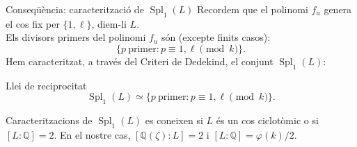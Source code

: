 \documentclass[11pt]{beamer}
\newcommand{\Q}{\ensuremath{\mathbb{Q}}}
\DeclareMathOperator{\Spl}{Spl} %
\begin{document}
	\begin{frame}{Conseqüència: caracterització de $\Spl_1(L)$}
	Recordem que el polinomi $f_u$ genera el cos fix per $\{1,\ell\}$, diem-li $L$.\pause \newline \\
	Els divisors primers del polinomi $f_u$ són (excepte finits casos):
	\begin{equation*}
		\{p \ \text{primer}: p\equiv 1,\ell\pmod{k}\}.
	\end{equation*}\pause
	Hem caracteritzat, a través del Criteri de Dedekind, el conjunt $\Spl_1(L)$:
	\begin{exampleblock}{Llei de reciprocitat}
		\begin{equation*}
			\Spl_1(L)\simeq\{p \ \text{primer}: p\equiv 1, \ell \pmod{k}\}.
		\end{equation*}
	\end{exampleblock}
	\pause
	Caracteritzacions de $\Spl_1(L)$ es coneixen si $L$ és un cos ciclotòmic o si $[L:\Q]=2$. En el nostre cas, $[\Q(\zeta):L]=2$ i $[L:\Q]=\varphi(k)/2$.
\end{frame}
	
\end{document}
